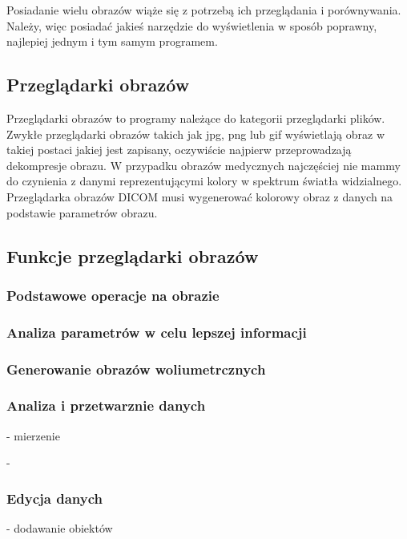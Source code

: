 
Posiadanie wielu obrazów wiąże się z potrzebą ich przeglądania i porównywania.
Należy, więc posiadać jakieś narzędzie do wyświetlenia w sposób poprawny, najlepiej jednym i tym samym programem.

\subsection{Przeglądarki obrazów}

Przeglądarki obrazów to programy należące do kategorii przeglądarki plików.
Zwykłe przeglądarki obrazów takich jak jpg, png lub gif wyświetlają obraz w takiej postaci jakiej jest zapisany, oczywiście najpierw przeprowadzają dekompresje obrazu.
W przypadku obrazów medycznych najczęściej nie mammy do czynienia z danymi reprezentującymi kolory w spektrum światła widzialnego.
Przeglądarka obrazów DICOM musi wygenerować kolorowy obraz z danych na podstawie parametrów obrazu.


\subsection{Funkcje przeglądarki obrazów}

\subsubsection{Podstawowe operacje na obrazie}

\subsubsection{Analiza parametrów w celu lepszej informacji}

\subsubsection{Generowanie obrazów woliumetrcznych}

\subsubsection{Analiza i przetwarznie danych}

- mierzenie

- 

\subsubsection{Edycja danych}

- dodawanie obiektów


